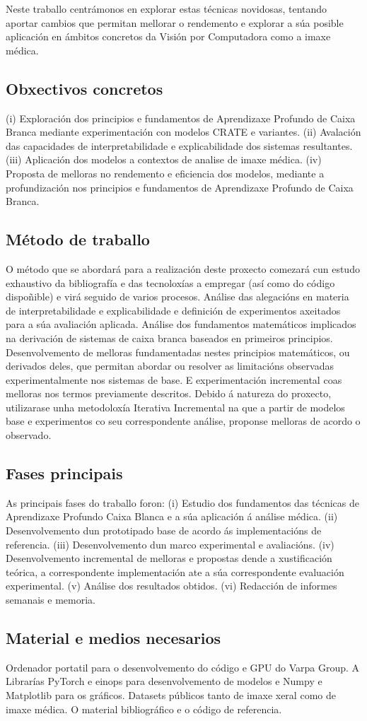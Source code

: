 \documentclass[a4paper,12pt]{article}
\begin{document}
Neste traballo centrámonos en explorar estas técnicas novidosas, tentando aportar cambios que permitan mellorar o rendemento e explorar a súa posible aplicación en ámbitos concretos da Visión por Computadora como a imaxe médica.

\subsection{Obxectivos concretos}
(i) Exploración dos principios e fundamentos de Aprendizaxe Profundo de Caixa Branca mediante experimentación con modelos CRATE e variantes.
(ii) Avalación das capacidades de interpretabilidade e explicabilidade dos sistemas resultantes.
(iii) Aplicación dos modelos a contextos de analise de imaxe médica.
(iv) Proposta de melloras no rendemento e eficiencia dos modelos, mediante a profundización nos principios e fundamentos de Aprendizaxe Profundo de Caixa Branca.

\subsection{Método de traballo}
O método que se abordará para a realización deste proxecto comezará cun estudo exhaustivo da bibliografía e das tecnoloxías a empregar (así como do código dispoñible) e virá seguido de varios procesos. Análise das alegacións en materia de interpretabilidade e explicabilidade  e definición de experimentos axeitados para a súa avaliación aplicada. Análise dos fundamentos matemáticos implicados na derivación de sistemas de caixa branca baseados en primeiros principios. Desenvolvemento de melloras fundamentadas nestes principios matemáticos, ou derivados deles, que permitan abordar ou resolver as limitacións observadas experimentalmente nos sistemas de base. E experimentación incremental coas melloras nos termos previamente descritos. Debido á natureza do proxecto, utilizarase unha metodoloxía Iterativa Incremental na que a partir de modelos base e experimentos co seu correspondente análise, proponse melloras de acordo o observado.

\subsection{Fases principais}
As principais fases do traballo foron: (i) Estudio dos fundamentos das técnicas de Aprendizaxe Profundo Caixa Blanca e a súa aplicación á análise médica.
(ii) Desenvolvemento dun prototipado base de acordo ás implementacións de referencia.
(iii) Desenvolvemento dun marco experimental e avaliacións.
(iv) Desenvolvemento incremental de melloras e propostas dende a xustificación teórica, a correspondente implementación ate a súa correspondente evaluación experimental.
(v) Análise dos resultados obtidos.
(vi) Redacción de informes semanais e memoria.
\subsection{Material e medios necesarios}
Ordenador portatil para o desenvolvemento do código e GPU do Varpa Group. A Librarías PyTorch e einops para desenvolvemento de modelos e Numpy e Matplotlib para os gráficos. Datasets públicos tanto de imaxe xeral como de imaxe médica. O material bibliográfico e o código de referencia.
\end{document}
